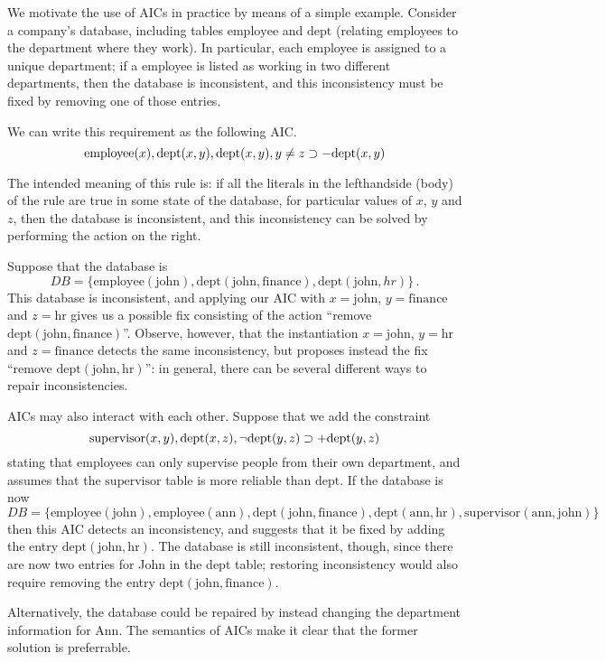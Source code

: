 \begin{example}
  We motivate the use of AICs in practice by means of a simple example.
  Consider a company's database, including tables $\mathrm{employee}$ and $\mathrm{dept}$ (relating employees to the department where they work).
  In particular, each employee is assigned to a unique department; if a employee is listed as working in two different departments, then the database is inconsistent, and this inconsistency must be fixed by removing one of those entries.

  We can write this requirement as the following AIC.
  \[
  \mathrm{employee}(x),\mathrm{dept}(x,y),\mathrm{dept}(x,y),y\neq z \supset -\mathrm{dept}(x,y)
  \]

  The intended meaning of this rule is: if all the literals in the lefthandside (body) of the rule are true in some state of the database, for particular values of $x$, $y$ and $z$, then the database is inconsistent, and this inconsistency can be solved by performing the action on the right.

  Suppose that the database is
  \[DB=\{\mathrm{employee}(\mathrm{john}),\mathrm{dept}(\mathrm{john},\mathrm{finance}),\mathrm{dept}(\mathrm{john},{hr})\}\,.\]
  This database is inconsistent, and applying our AIC with $x=\mathrm{john}$, $y=\mathrm{finance}$ and $z=\mathrm{hr}$ gives us a possible fix consisting of the action ``remove $\mathrm{dept}(\mathrm{john},\mathrm{finance})$''.
  Observe, however, that the instantiation $x=\mathrm{john}$, $y=\mathrm{hr}$ and $z=\mathrm{finance}$ detects the same inconsistency, but proposes instead the fix ``remove $\mathrm{dept}(\mathrm{john},\mathrm{hr})$'': in general, there can be several different ways to repair inconsistencies.

  AICs may also interact with each other.
  Suppose that we add the constraint
  \[\mathrm{supervisor}(x,y),\mathrm{dept}(x,z),\neg\mathrm{dept}(y,z)\supset +\mathrm{dept}(y,z)\]
  stating that employees can only supervise people from their own department, and assumes that the $\mathrm{supervisor}$ table is more reliable than $\mathrm{dept}$.
  If the database is now
  \[
    DB=\{\mathrm{employee}(\mathrm{john}),\mathrm{employee}(\mathrm{ann}),
    \mathrm{dept}(\mathrm{john},\mathrm{finance}),\mathrm{dept}(\mathrm{ann},\mathrm{hr}),
    \mathrm{supervisor}(\mathrm{ann},\mathrm{john})\}
  \]
  then this AIC detects an inconsistency, and suggests that it be fixed by adding the entry $\mathrm{dept}(\mathrm{john},\mathrm{hr})$.
  The database is still inconsistent, though, since there are now two entries for John in the $\mathrm{dept}$ table; restoring inconsistency would also require removing the entry $\mathrm{dept}(\mathrm{john},\mathrm{finance})$.

  Alternatively, the database could be repaired by instead changing the department information for Ann.
  The semantics of AICs make it clear that the former solution is preferrable.
\end{example}


